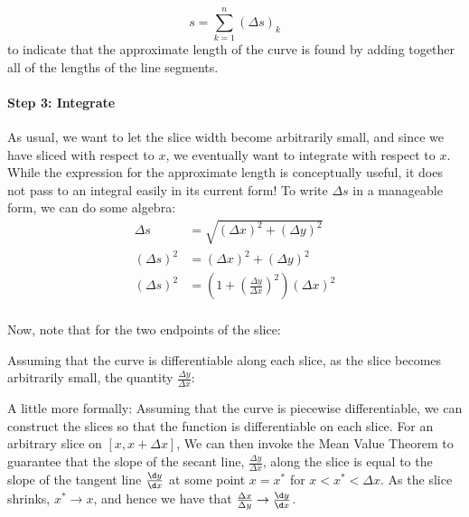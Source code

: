 \documentclass{ximera}
\begin{document}
\[ 
s = \sum_{k=1}^n (\Delta s)_k
\]
to indicate that the approximate length of the curve is found by adding together all of the lengths of the line segments.

\paragraph{Step 3: Integrate}
As usual, we want to let the slice width become arbitrarily small, and since we have sliced with respect to $x$, we eventually want to integrate with respect to $x$.  While the expression for the approximate length is conceptually useful, it does not pass to an integral easily in its current form!  To write $\Delta s$ in a manageable form, we can do some algebra:
\begin{align*}
	\Delta s  &= \sqrt{(\Delta x)^2+(\Delta y)^2}\\
	\left( \Delta s \right)^2 &= \left( \Delta x \right)^2 + \left( \Delta y \right)^2\\
	\left( \Delta s \right)^2 &= \left( 1 + \left( \frac{\Delta y}{\Delta x} \right)^2 \right) \left( \Delta x\right)^2\\
\end{align*}

Now, note that for the two endpoints of the slice:

\begin{multipleChoice}
\end{multipleChoice}

Assuming that the curve is differentiable along each slice, as the slice becomes arbitrarily small, the quantity $\frac{\Delta y}{\Delta x}$:

\begin{multipleChoice}
\end{multipleChoice}

\begin{remark}
A little more formally: Assuming that the curve is piecewise differentiable, we can construct the slices so that the function is differentiable on each slice.  For an arbitrary slice on $[x, x+\Delta x]$, We can then invoke the Mean Value Theorem to guarantee that the slope of the secant line, $\frac{\Delta y}{\Delta x}$, along the slice is equal to the slope of the tangent line $\frac{\d y}{\d x}$ at some point $x=x^*$ for $x<x^*<\Delta x$.  As the slice shrinks, $x^* \rightarrow x$, and hence we have that $\frac{\Delta x}{\Delta y} \rightarrow \frac{\d y}{\d x}$.
\end{remark}
\end{document}

